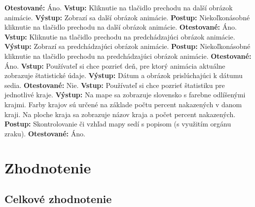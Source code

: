 \documentclass[12pt,a4paper]{report}
\begin{document}
\begin{flushleft}
	\textbf{Otestované:} Áno.\linebreak
	\linebreak
	\textbf{Vstup:} Kliknutie na tlačidlo prechodu na další obrázok animácie.\linebreak
	\textbf{Výstup:} Zobrazí sa další obrázok animácie.\linebreak
	\textbf{Postup:} Niekoľkonásobné kliknutie na tlačidlo prechodu na další obrázok animácie. \linebreak
	\textbf{Otestované:} Áno.\linebreak
	\linebreak
	\textbf{Vstup:} Kliknutie na tlačidlo prechodu na predchádzajúci obrázok animácie.\linebreak
	\textbf{Výstup:} Zobrazí sa predchádzajúci obrázok animácie.\linebreak
	\textbf{Postup:} Niekoľkonásobné kliknutie na tlačidlo prechodu na predchádzajúci obrázok animácie. \linebreak
	\textbf{Otestované:} Áno.\linebreak
	\linebreak
	\textbf{Vstup:} Používateľ si chce pozrieť deň, pre ktorý animácia aktuálne zobrazuje štatistické údaje.\linebreak
	\textbf{Výstup:} Dátum a obrázok prislúchajúci k dátumu sedia.\linebreak
	\textbf{Otestované:} Nie.\linebreak
	\linebreak
	\textbf{Vstup:} Používateľ si chce pozrieť štatistiku pre jednotlivé kraje.\linebreak
	\textbf{Výstup:} Na mape sa zobrazuje slovensko s farebne odlíšenými krajmi. Farby krajov sú určené na základe počtu percent nakazených v danom kraji. Na ploche kraja sa zobrazuje názov kraja a počet percent nakazených.\linebreak
	\textbf{Postup:} Skontrolovanie či vzhľad mapy sedí s popisom (s využitím orgánu zraku). \linebreak
	\textbf{Otestované:} Áno.\linebreak
\end{flushleft}

\chapter[Zhodnotenie]{\rmfamily\bfseries
	Zhodnotenie}
\section[Celkové zhodnotenie]{\rmfamily\bfseries
	Celkové zhodnotenie}
\end{document}
